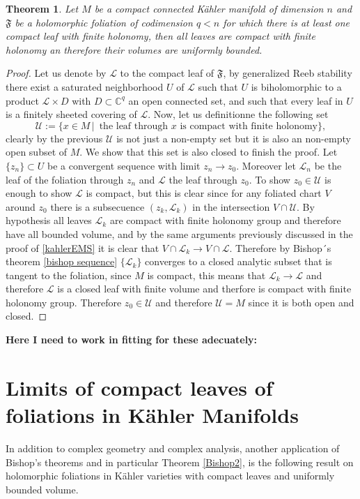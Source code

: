 \documentclass[12pt,twoside,a4paper]{report}
\newtheorem{theorem}{Theorem}[section]
\newcommand{\co}{\ensuremath{\mathbb C }}
\begin{document}
\begin{theorem}\label{compact-leaf}
Let $M$ be a compact connected K\"ahler manifold of dimension $n$ and $\mathfrak{F}$ be a holomorphic foliation of codimension $q<n$ for which there is at least one compact leaf with finite holonomy, then all leaves are compact with finite holonomy an therefore their volumes are uniformly bounded.
\end{theorem}
\begin{proof}
  Let us denote by $\mathcal L$ to the compact leaf of $\mathfrak F$, by generalized Reeb stability there exist a saturated neighborhood $U$ of $\mathcal{L}$ such that $U$ is biholomorphic to a product $\mathcal{L}\times D$ with $D\subset\co^{q}$ an open connected set, and such that every leaf in $U$ is a finitely sheeted covering of $\mathcal{L}$. Now, let us definitionne the following set
\[
    \mathcal{U}:=\{x\in M\,\vert\, \text{ the leaf through $x$ is compact with finite holonomy}\},
\]
clearly by the previous $\mathcal{U}$ is not just a non-empty set but it is also an non-empty open subset of $M$. We show that this set is also closed to finish the proof. Let $\{z_{n}\}\subset U$ be a convergent sequence with limit $z_{n}\rightarrow z_{0}$.
Moreover let $\mathcal{L}_{n}$ be the leaf of the foliation through $z_{n}$ and $\mathcal{L}$ the leaf through $z_{0}$.
To show $z_{0}\in\mathcal{U}$ is enough to show $\mathcal{L}$ is compact, but this is clear since for any foliated chart $V$ around $z_{0}$ there is a subsecuence $(z_{k},\mathcal{L}_{k})$ in the intersection $V\cap\mathcal{U}$.
By hypothesis all leaves $\mathcal{L}_{k}$ are compact with finite holonomy group and therefore have all bounded volume, and by the same arguments previously discussed in the proof of \ref{kahlerEMS} it is clear that $V\cap\mathcal{L}_{k}\rightarrow V\cap\mathcal{L}$.
Therefore by Bishop´s theorem \ref{bishop sequence} $\{\mathcal{L}_{k}\}$ converges to a closed analytic subset that is tangent to the foliation, since $M$ is compact, this means that $\mathcal{L}_{k}\rightarrow\mathcal{L}$ and therefore $\mathcal{L}$ is a closed leaf with finite volume and therfore is compact with finite holonomy group. Therefore $z_{0}\in\mathcal{U}$ and therefore $\mathcal{U}=M$  since it is both open and closed.
\end{proof}


{\huge\noindent\textbf{Here I need to work in fitting for these adecuately:}}

\section{Limits of compact leaves of foliations in K\"ahler Manifolds}
\noindent In addition to complex geometry and complex analysis, another application of Bishop's theorems and in particular Theorem
\ref{Bishop2}, is the following result on holomorphic foliations in K\"ahler varieties with compact leaves and uniformly bounded volume.
\end{document}
